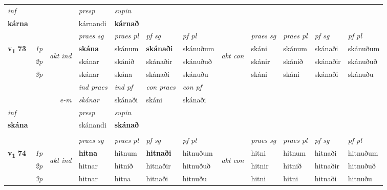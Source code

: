 \begin{longtable}[l]{X>{\footnotesize\itshape}llXXXXlXXXX}
   {\textit{inf}} & &     & \textit{presp} & \textit{supin}   \\*
  {\textbf{kárna}} & &     & kárnandi &  \textbf{kárnað}   \\*

\midrule

 & &   & \textit{praes sg}  & \textit{praes pl}    & \textit{ pf sg} & \textit{pf pl} & & \textit{praes sg}  & \textit{praes pl}    & \textit{pf sg} & \textit{pf pl }  \\ \cmidrule{4-7} \cmidrule{9-12}
 \multirow{2}{*}{{{\textbf{v{\textsubscript{1}}} \Large{\textbf{73}}}}}  & 1p & \multirow{3}{*}{\begin{turn}{90}\textit{akt ind}\end{turn}} & \textbf{skána} & skánum & \textbf{skánaði} & skánuðum & \multirow{3}{*}{\begin{turn}{90}\textit{akt con}\end{turn}} &skáni & skánum & skánaði & skánuðum\\*
 & 2p &  &  skánar  & skánið & skánaðir & skánuðuð & & skánir & skánið & skánaðir & skánuðuð \\*
 & 3p &  & skánar & skána & skánaði & skánuðu & & skáni & skáni& skánaði & skánuðu \\*
\cmidrule{4-7} \cmidrule{9-12}

   && &  \textit{ind praes} & \textit{ind pf} & \textit{con praes} & \textit{con pf} \\*
\multicolumn{3}{r}{\textit{e-m}} & skánar & skánaði & skáni & skánaði \\*

\cmidrule{4-7}
   {\textit{inf}} & &     & \textit{presp} & \textit{supin}   \\*
  {\textbf{skána}} & &     & skánandi &  \textbf{skánað}   \\*

\midrule


  & \\
   \midrule
 & &   & \textit{praes sg}  & \textit{praes pl}    & \textit{ pf sg} & \textit{pf pl} & & \textit{praes sg}  & \textit{praes pl}    & \textit{pf sg} & \textit{pf pl }  \\ \cmidrule{4-7} \cmidrule{9-12}
 \multirow{2}{*}{{{\textbf{v{\textsubscript{1}}} \Large{\textbf{74}}}}}  & 1p & \multirow{3}{*}{\begin{turn}{90}\textit{akt ind}\end{turn}} & \textbf{hitna} & hitnum & \textbf{hitnaði} & hitnuðum & \multirow{3}{*}{\begin{turn}{90}\textit{akt con}\end{turn}} &hitni & hitnum & hitnaði & hitnuðum\\*
 & 2p &  &  hitnar  & hitnið & hitnaðir & hitnuðuð & & hitnir & hitnið & hitnaðir & hitnuðuð \\*
 & 3p &  & hitnar & hitna & hitnaði & hitnuðu & & hitni & hitni& hitnaði & hitnuðu \\*
\cmidrule{4-7} \cmidrule{9-12}


\end{longtable}

